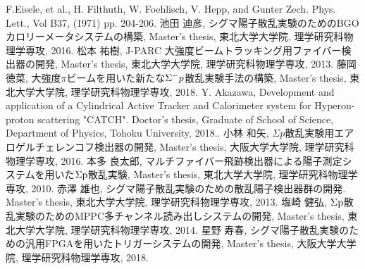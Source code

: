 \begin{thebibliography}{99}
F.Eisele, et al., H. Filthuth, W. Foehlisch, V. Hepp, and Gunter Zech. Phys. Lett., Vol B37, (1971) pp. 204-206.
池田 迪彦, シグマ陽子散乱実験のためのBGOカロリーメータシステムの構築, Master's thesis, 東北大学大学院, 理学研究科物理学専攻, 2016.
松本 祐樹, J-PARC 大強度ビームトラッキング用ファイバー検出器の開発, Master's thesis, 東北大学大学院, 理学研究科物理学専攻, 2013.
藤岡 徳菜, 大強度$\pi$ビームを用いた新たな$\Sigma^{-} p$散乱実験手法の構築, Master's thesis, 東北大学大学院, 理学研究科物理学専攻, 2018.
Y. Akazawa, Development and application of a Cylindrical Active Tracker and Calorimeter system for Hyperon-proton scattering "CATCH". Doctor's thesis, Graduate of School of Science, Department of Physics, Tohoku University, 2018..
小林 和矢, $\Sigma p$散乱実験用エアロゲルチェレンコフ検出器の開発, Master's thesis, 大阪大学大学院, 理学研究科物理学専攻, 2016.
本多 良太郎, マルチファイバー飛跡検出器による陽子測定システムを用いた${\rm \Sigma p}$散乱実験, Master's thesis, 東北大学大学院, 理学研究科物理学専攻, 2010.
赤澤 雄也, シグマ陽子散乱実験のための散乱陽子検出器群の開発. Master's thesis, 東北大学大学院, 理学研究科物理学専攻, 2013.
塩崎 健弘, ${\rm \Sigma p}$散乱実験のためのMPPC多チャンネル読み出しシステムの開発, Master's thesis, 東北大学大学院, 理学研究科物理学専攻, 2014.
星野 寿春, シグマ陽子散乱実験のための汎用FPGAを用いたトリガーシステムの開発, Master's thesis, 大阪大学大学院, 理学研究科物理学専攻, 2018.

\end{thebibliography}

%
